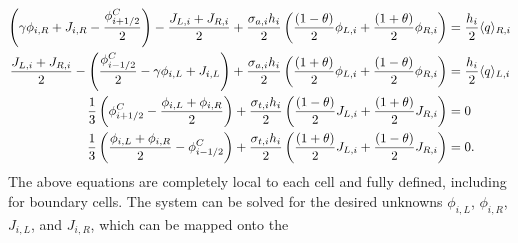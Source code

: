 \begin{align}
    \left(\gamma\phi_{i,R} + J_{i,R} - \frac{\phi_{{i+1/2}}^C}{2} \right) - \frac{J_{L,i} + J_{R,i}}{2} + \frac{\sigma_{a,i} h_i}{2} \left(
    \frac{(1-\theta)}{2} \phi_{L,i} +
    \frac{(1+\theta)}{2}\phi_{R,i}\right) &= \frac{h_i}{2} \langle q \rangle_{R,i} \\
    \frac{J_{L,i} + J_{R,i}}{2} -\left(\frac{\phi_{i-1/2}^C}{2} - \gamma \phi_{i,L} +
    J_{i,L}\right) + \frac{\sigma_{a,i} h_i}{2} \left(
    \frac{(1+\theta)}{2} \phi_{L,i} +
    \frac{(1-\theta)}{2}\phi_{R,i}\right) &= \frac{h_i}{2} \langle q \rangle_{L,i} 
    \\
    \frac{1}{3}\left(\phi_{i+1/2}^C - \frac{\phi_{i,L} + \phi_{i,R}}{2}\right) +
    \frac{\sigma_{t,i} h_i}{2}\left( \frac{(1-\theta)}{2} J_{L,i} +
    \frac{(1+\theta)}{2}J_{R,i}\right)    &= 0 \\
    \frac{1}{3}\left(\frac{\phi_{i,L} + \phi_{i,R}}{2} - \phi^C_{i-1/2} \right) +
    \frac{\sigma_{t,i} h_i}{2} \left( \frac{(1+\theta)}{2} J_{L,i} +
    \frac{(1-\theta)}{2}J_{R,i}\right) &= 0 .
\end{align}
The above equations are completely local to each cell and fully defined, including for
boundary cells.  The system can be
solved for the desired unknowns
$\phi_{i,L}$, $\phi_{i,R}$, $J_{i,L}$, and $J_{i,R}$, which can be mapped onto the 

